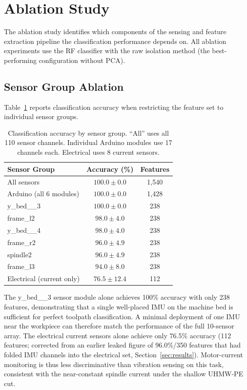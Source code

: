 \section{Ablation Study}\label{sec:ablation}

The ablation study identifies which components of the sensing and feature extraction pipeline the classification performance depends on. All ablation experiments use the RF classifier with the raw isolation method (the best-performing configuration without PCA).

\subsection{Sensor Group Ablation}

Table~\ref{tab:sensor_ablation} reports classification accuracy when restricting the feature set to individual sensor groups.

\begin{table}[H]
\caption{Classification accuracy by sensor group. ``All'' uses all 110 sensor channels. Individual Arduino modules use 17 channels each. Electrical uses 8 current sensors.}\label{tab:sensor_ablation}
\centering
\begin{tabular}{lcc}
\toprule
\textbf{Sensor Group} & \textbf{Accuracy (\%)} & \textbf{Features} \\
\midrule
All sensors              & $100.0 \pm 0.0$ & 1{,}540 \\
Arduino (all 6 modules)  & $100.0 \pm 0.0$ & 1{,}428 \\
y\_bed\_\_3              & $100.0 \pm 0.0$ & 238 \\
frame\_l2                & $98.0 \pm 4.0$ & 238 \\
y\_bed\_\_4              & $98.0 \pm 4.0$ & 238 \\
frame\_r2                & $96.0 \pm 4.9$ & 238 \\
spindle2                 & $96.0 \pm 4.9$ & 238 \\
frame\_l3                & $94.0 \pm 8.0$ & 238 \\
Electrical (current only) & $76.5 \pm 12.4$ & 112 \\
\bottomrule
\end{tabular}
\end{table}

The y\_bed\_\_3 sensor module alone achieves 100\% accuracy with only 238 features, demonstrating that a single well-placed IMU on the machine bed is sufficient for perfect toolpath classification. A minimal deployment of one IMU near the workpiece can therefore match the performance of the full 10-sensor array. The electrical current sensors alone achieve only 76.5\% accuracy (112 features; corrected from an earlier leaked figure of 96.0\%/350 features that had folded IMU channels into the electrical set, Section~\ref{sec:results}). Motor-current monitoring is thus less discriminative than vibration sensing on this task, consistent with the near-constant spindle current under the shallow UHMW-PE cut.

